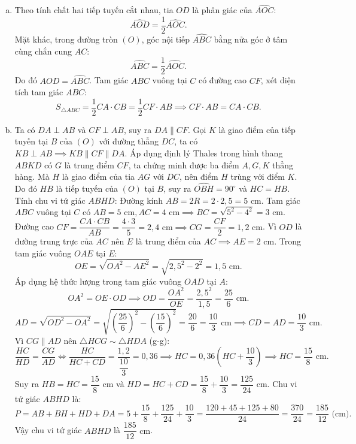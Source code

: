 \begin{bt}
{\begin{enumerate}[a)]
	Tứ giác $OACD$ có $\widehat{OAD} + \widehat{OCD} = 90^\circ + 90^\circ = 180^\circ$, do đó bốn điểm $O, A, C, D$ cùng thuộc đường tròn đường kính $OD$.
	Tam giác $ABC$ nội tiếp đường tròn $(O)$ có cạnh $AB$ là đường kính nên $\widehat{ACB} = 90^\circ$, suy ra $BC \perp AC$.
	\item Theo tính chất hai tiếp tuyến cắt nhau, tia $OD$ là phân giác của $\widehat{AOC}$:
	$$\widehat{AOD} = \dfrac{1}{2}\widehat{AOC}.$$
	Mặt khác, trong đường tròn $(O)$, góc nội tiếp $\widehat{ABC}$ bằng nửa góc ở tâm cùng chắn cung $AC$:
	$$\widehat{ABC} = \dfrac{1}{2}\widehat{AOC}.$$
	Do đó $\widehat{AOD} = \widehat{ABC}$.
	Tam giác $ABC$ vuông tại $C$ có đường cao $CF$, xét diện tích tam giác $ABC$:
	$$S_{\triangle ABC} = \dfrac{1}{2} CA \cdot CB = \dfrac{1}{2} CF \cdot AB \implies CF \cdot AB = CA \cdot CB.$$
	\item Ta có $DA \perp AB$ và $CF \perp AB$, suy ra $DA \parallel CF$.
	Gọi $K$ là giao điểm của tiếp tuyến tại $B$ của $(O)$ với đường thẳng $DC$, ta có $KB \perp AB \implies KB \parallel CF \parallel DA$.
	Áp dụng định lý Thales trong hình thang $ABKD$ có $G$ là trung điểm $CF$, ta chứng minh được ba điểm $A, G, K$ thẳng hàng.
	Mà $H$ là giao điểm của tia $AG$ với $DC$, nên điểm $H$ trùng với điểm $K$.
	Do đó $HB$ là tiếp tuyến của $(O)$ tại $B$, suy ra $\widehat{OBH} = 90^\circ$ và $HC = HB$.
	Tính chu vi tứ giác $ABHD$:
	Đường kính $AB = 2R = 2 \cdot 2{,}5 = 5\text{ cm}$.
	Tam giác $ABC$ vuông tại $C$ có $AB = 5\text{ cm}, AC = 4\text{ cm} \implies BC = \sqrt{5^2 - 4^2} = 3\text{ cm}$.
	Đường cao $CF = \dfrac{CA \cdot CB}{AB} = \dfrac{4 \cdot 3}{5} = 2{,}4\text{ cm} \implies CG = \dfrac{CF}{2} = 1{,}2\text{ cm}$.
	Vì $OD$ là đường trung trực của $AC$ nên $E$ là trung điểm của $AC \implies AE = 2\text{ cm}$.
	Trong tam giác vuông $OAE$ tại $E$:
	$$OE = \sqrt{OA^2 - AE^2} = \sqrt{2{,}5^2 - 2^2} = 1{,}5\text{ cm}.$$
	Áp dụng hệ thức lượng trong tam giác vuông $OAD$ tại $A$:
	$$OA^2 = OE \cdot OD \implies OD = \dfrac{OA^2}{OE} = \dfrac{2{,}5^2}{1{,}5} = \dfrac{25}{6}\text{ cm}.$$
	$$AD = \sqrt{OD^2 - OA^2} = \sqrt{\left(\dfrac{25}{6}\right)^2 - \left(\dfrac{15}{6}\right)^2} = \dfrac{20}{6} = \dfrac{10}{3}\text{ cm} \implies CD = AD = \dfrac{10}{3}\text{ cm}.$$
	Vì $CG \parallel AD$ nên $\triangle HCG \sim \triangle HDA$ (g-g):
	$$\dfrac{HC}{HD} = \dfrac{CG}{AD} \iff \dfrac{HC}{HC + CD} = \dfrac{1{,}2}{\dfrac{10}{3}} = 0{,}36 \implies HC = 0{,}36\left(HC + \dfrac{10}{3}\right) \implies HC = \dfrac{15}{8}\text{ cm}.$$
	Suy ra $HB = HC = \dfrac{15}{8}\text{ cm}$ và $HD = HC + CD = \dfrac{15}{8} + \dfrac{10}{3} = \dfrac{125}{24}\text{ cm}$.
	Chu vi tứ giác $ABHD$ là:
	$$P = AB + BH + HD + DA = 5 + \dfrac{15}{8} + \dfrac{125}{24} + \dfrac{10}{3} = \dfrac{120 + 45 + 125 + 80}{24} = \dfrac{370}{24} = \dfrac{185}{12}\text{ (cm)}.$$
	Vậy chu vi tứ giác $ABHD$ là $\dfrac{185}{12}\text{ cm}$.
\end{enumerate}
}
\end{bt}

